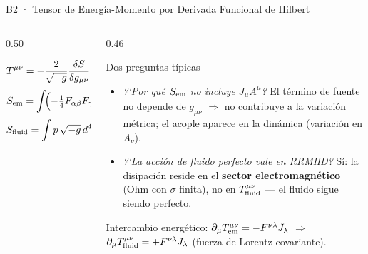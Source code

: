 \documentclass[aspectratio=169,9pt]{beamer}
\begin{document}
\begin{frame}{B2 · Tensor de Energ\'ia-Momento por Derivada Funcional de Hilbert}
\begin{columns}[T]
\begin{column}{0.50\textwidth}
  \begin{tcolorbox}[EQ={Definici\'on variacional}]
    \scriptsize
    \[
      T^{\mu\nu}=-\frac{2}{\sqrt{-g}}\frac{\delta S}{\delta g_{\mu\nu}},
      \qquad S=S_{\rm em}+S_{\rm fluid}
    \]
    \[
      S_{\rm em}=\int\!\Bigl(-\tfrac14F_{\alpha\beta}F_{\gamma\delta}
        g^{\alpha\gamma}g^{\beta\delta}\Bigr)\sqrt{-g}\,d^4x
      \;\Rightarrow\;
      T^{\mu\nu}_{\rm em}
    \]
    \[
      S_{\rm fluid}=\int p\,\sqrt{-g}\,d^4x\ \text{(Taub)}
      \;\Rightarrow\;
      T^{\mu\nu}_{\rm fluid}=\rho h\,u^\mu u^\nu+p\,\eta^{\mu\nu}
    \]
  \end{tcolorbox}
\end{column}
\begin{column}{0.46\textwidth}
  \begin{block}{Dos preguntas t\'ipicas}
    \scriptsize
    \begin{itemize}\setlength\itemsep{3pt}
      \item \emph{?`Por qu\'e $S_{\rm em}$ no incluye $J_\mu A^\mu$?}
            El t\'ermino de fuente no depende de $g_{\mu\nu}$
            $\Rightarrow$ no contribuye a la variaci\'on m\'etrica;
            el acople aparece en la din\'amica (variaci\'on en $A_\nu$).
      \item \emph{?`La acci\'on de fluido perfecto vale en RRMHD?}
            S\'i: la disipaci\'on reside en el \textbf{sector
            electromagn\'etico} (Ohm con $\sigma$ finita), no en
            $T^{\mu\nu}_{\rm fluid}$ --- el fluido sigue siendo perfecto.
    \end{itemize}
  \end{block}
  \vspace{0.08cm}
  {\scriptsize Intercambio energ\'etico:
   $\partial_\mu T^{\mu\nu}_{\rm em}=-F^{\nu\lambda}J_\lambda$
   $\Rightarrow$ $\partial_\mu T^{\mu\nu}_{\rm fluid}=+F^{\nu\lambda}J_\lambda$
   (fuerza de Lorentz covariante).}
\end{column}
\end{columns}
\end{frame}
\end{document}
